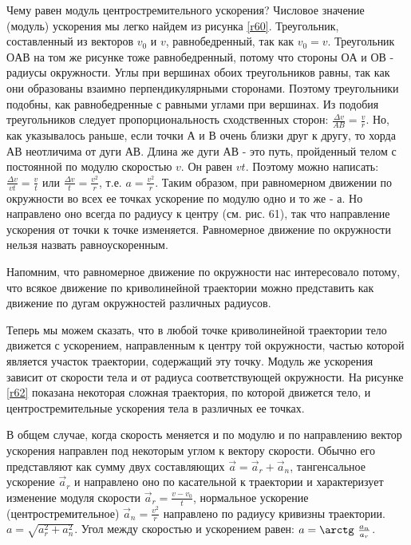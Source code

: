\documentclass[a5paper, 10pt]{diss_4}
\renewcommand{\'}{\,'}
\begin{document}
  Чему равен модуль центростремительного ускорения? Числовое значение
(модуль) ускорения мы легко найдем из рисунка \ref{r60}. Треугольник, составленный из
 векторов $v_0$ и $v$, равнобедренный, так как $v_0=v$. Треугольник $ОАВ$ на
том же рисунке тоже равнобедренный, потому что стороны $ОА$ и $ОВ$ - радиусы
окружности. Углы при вершинах обоих треугольников равны, так как они
образованы взаимно перпендикулярными сторонами. Поэтому треугольники подобны,
как равнобедренные с равными углами при вершинах. Из подобия треугольников
следует пропорциональность сходственных сторон: $\frac{\Delta
v}{AB}=\frac{v}{r}$. Но, как указывалось раньше, если точки $А$ и $В$ очень
близки друг к другу, то хорда $АВ$ неотличима от дуги $АВ$. Длина же дуги $АВ$ -
 это путь, пройденный телом с постоянной по модулю скоростью $v$. Он равен
$vt$. Поэтому можно написать: $\frac{\Delta v}{vt}=\frac{v}{t}$ или
$\frac{\Delta v}{t}=\frac{v^2}{r}$, т.е. $a=\frac{v^2}{r}$. Таким образом, при
равномерном движении по окружности во всех ее точках ускорение по модулю одно
и то же - $а$. Но направлено оно всегда по радиусу к центру (см. рис. 61), так
что направление ускорения от точки к точке изменяется. Равномерное движение
по окружности нельзя назвать равноускоренным.

  Напомним, что равномерное движение по окружности нас интересовало
потому, что всякое движение по криволинейной траектории можно представить как
движение по дугам окружностей различных радиусов.

  Теперь мы можем сказать, что в любой точке криволинейной траектории
тело движется с ускорением, направленным к центру той окружности, частью
которой является участок траектории, содержащий эту точку. Модуль же ускорения
зависит от скорости тела и от радиуса соответствующей окружности. На рисунке \ref{r62}
показана некоторая сложная траектория, по которой движется тело, и
центростремительные ускорения тела в различных ее точках.

  В общем случае, когда скорость меняется и по модулю и по направлению вектор
ускорения направлен под некоторым углом к вектору скорости. Обычно его
представляют как сумму двух составляющих $\vec{a}=\vec{a}_r+\vec{a}_n$,
тангенсальное ускорение $\vec{a}_r$ и направлено оно по касательной к
траектории и характеризует изменение модуля скорости $\vec{a}_r=\frac{v-
v_0}{t}$, нормальное ускорение (центростремительное) $\vec{a}_n=\frac{v^2}{r}$
 направлено по радиусу кривизны траектории. $a=\sqrt{a^2_r+a^2_n}$. Угол между
скоростью и ускорением равен: $a=\arctg\ \frac{a_n}{a_r}$.
\end{document}
